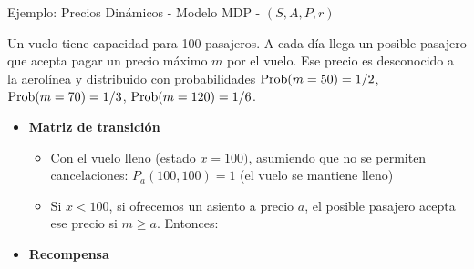 \documentclass[handout]{beamer}
\begin{document}
\begin{frame}{Ejemplo: Precios Dinámicos - Modelo MDP - $(S,A,P,r)$}

Un vuelo tiene capacidad para 100 pasajeros. A cada día llega un posible pasajero que acepta pagar un precio máximo $m$ por el vuelo. Ese precio es desconocido a la aerolínea y distribuido con probabilidades {\small ${\rm Prob}(m = 50) = 1/2$, ${\rm Prob}(m = 70) = 1/3$, ${\rm Prob}(m = 120) = 1/6$.}
\begin{itemize}
\item {\bf Matriz de transición} 
\begin{itemize}
\item<2-> Con el vuelo lleno (estado $x=100)$, asumiendo que no se permiten cancelaciones: $P_a(100,100) = 1$ (el vuelo se mantiene lleno)
\item<3-> Si $x<100$, si ofrecemos un asiento a precio $a$, el posible pasajero acepta ese precio si $m\geq a$. Entonces:
\end{itemize}

\item<5-> {\bf Recompensa} 
\end{itemize}
\end{frame}
\end{document}
